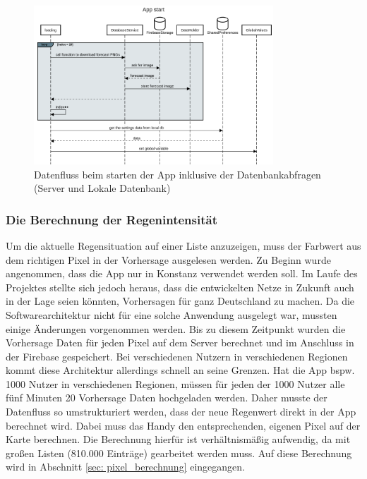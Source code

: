 \begin{figure}[H]
 \centering
 \includegraphics[width=0.8\textwidth,angle=0]{abb/sequence_diagram_app_start}
 \caption[Sequencediagram Appstart]{Datenfluss beim starten der App inklusive der Datenbankabfragen (Server und Lokale Datenbank)}
\label{fig:sequence_diagram_app_start}
\end{figure}

\subsubsection{Die Berechnung der Regenintensität}
Um die aktuelle Regensituation auf einer Liste anzuzeigen, muss der Farbwert aus dem richtigen Pixel in der Vorhersage ausgelesen werden. 
Zu Beginn wurde angenommen, dass die App nur in Konstanz verwendet werden soll. 
Im Laufe des Projektes stellte sich jedoch heraus, dass die entwickelten Netze in Zukunft auch in der Lage seien könnten, Vorhersagen 
für ganz Deutschland zu machen. Da die Softwarearchitektur nicht für eine solche Anwendung ausgelegt war, 
mussten einige Änderungen vorgenommen werden. 
Bis zu diesem Zeitpunkt wurden die Vorhersage Daten für jeden Pixel auf dem Server berechnet und im Anschluss in 
der Firebase gespeichert. 
Bei verschiedenen Nutzern in verschiedenen Regionen kommt diese Architektur allerdings schnell an seine Grenzen. 
Hat die App bspw. 1000 Nutzer in verschiedenen Regionen, 
müssen für jeden der 1000 Nutzer alle fünf Minuten 20 Vorhersage Daten hochgeladen werden. 
Daher musste der Datenfluss so umstrukturiert werden, dass der neue Regenwert direkt in der App berechnet wird. 
Dabei muss das Handy den entsprechenden, eigenen Pixel auf der Karte berechnen. 
Die Berechnung hierfür ist verhältnismäßig aufwendig, da mit großen Listen (810.000 Einträge) gearbeitet werden muss.
Auf diese Berechnung wird in Abschnitt \ref{sec: pixel_berechnung} eingegangen. 

